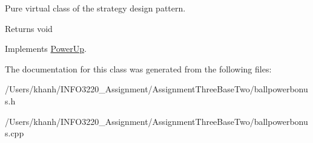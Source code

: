 Pure virtual class of the strategy design pattern. 

\begin{DoxyReturn}{Returns}
void 
\end{DoxyReturn}


Implements \hyperlink{class_power_up}{Power\+Up}.



The documentation for this class was generated from the following files\+:\begin{DoxyCompactItemize}
\item 
/\+Users/khanh/\+I\+N\+F\+O3220\+\_\+\+Assignment/\+Assignment\+Three\+Base\+Two/ballpowerbonus.\+h\item 
/\+Users/khanh/\+I\+N\+F\+O3220\+\_\+\+Assignment/\+Assignment\+Three\+Base\+Two/ballpowerbonus.\+cpp\end{DoxyCompactItemize}
